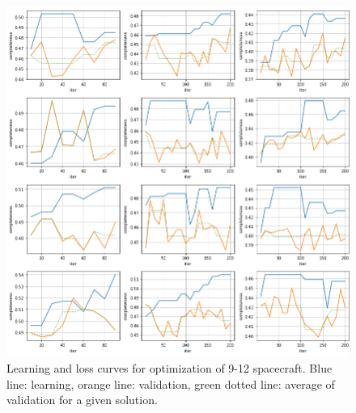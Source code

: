 \begin{figure}[p]
 \centering
 \includegraphics[width=1.0\textwidth]{img/appendix_loss_3.png}
 \caption{Learning and loss curves for optimization of 9-12 spacecraft. Blue line: learning, orange line: validation, green dotted line: average of validation for a given solution.}
\end{figure}



